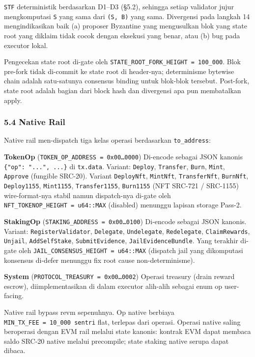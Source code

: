\documentclass[11pt,a4paper]{article}
\begin{document}
\texttt{STF} deterministik berdasarkan D1--D3 (§5.2), sehingga setiap validator jujur mengkomputasi \texttt{S\textquotesingle{}} yang sama dari \texttt{(S,\ B)} yang sama. Divergensi pada langkah 14 mengindikasikan baik (a) proposer Byzantine yang mengusulkan blok yang state root yang diklaim tidak cocok dengan eksekusi yang benar, atau (b) bug pada executor lokal.

Pengecekan state root di-gate oleh \texttt{STATE\_ROOT\_FORK\_HEIGHT\ =\ 100\_000}. Blok pre-fork tidak di-commit ke state root di header-nya; determinisme bytewise chain adalah satu-satunya consensus binding untuk blok-blok tersebut. Post-fork, state root adalah bagian dari block hash dan divergensi apa pun membatalkan apply.

\hypertarget{native-rail}{%
\subsubsection{5.4 Native Rail}\label{native-rail}}

Native rail men-dispatch tiga kelas operasi berdasarkan \texttt{to\_address}:

\textbf{TokenOp} (\texttt{TOKEN\_OP\_ADDRESS\ =\ 0x00…0000})
Di-encode sebagai JSON kanonis \texttt{\{"op":\ "...",\ ...\}} di \texttt{tx.data}. Variant: \texttt{Deploy}, \texttt{Transfer}, \texttt{Burn}, \texttt{Mint}, \texttt{Approve} (fungible SRC-20). Variant \texttt{DeployNft}, \texttt{MintNft}, \texttt{TransferNft}, \texttt{BurnNft}, \texttt{Deploy1155}, \texttt{Mint1155}, \texttt{Transfer1155}, \texttt{Burn1155} (NFT SRC-721 / SRC-1155) wire-format-nya stabil namun dispatch-nya di-gate oleh \texttt{NFT\_TOKENOP\_HEIGHT\ =\ u64::MAX} (disabled) menunggu lapisan storage Pass-2.

\textbf{StakingOp} (\texttt{STAKING\_ADDRESS\ =\ 0x00…0100})
Di-encode sebagai JSON kanonis. Variant: \texttt{RegisterValidator}, \texttt{Delegate}, \texttt{Undelegate}, \texttt{Redelegate}, \texttt{ClaimRewards}, \texttt{Unjail}, \texttt{AddSelfStake}, \texttt{SubmitEvidence}, \texttt{JailEvidenceBundle}. Yang terakhir di-gate oleh \texttt{JAIL\_CONSENSUS\_HEIGHT\ =\ u64::MAX} (dispatch jail yang dikomputasi konsensus di-defer menunggu fix root cause non-determinisme).

\textbf{System} (\texttt{PROTOCOL\_TREASURY\ =\ 0x00…0002})
Operasi treasury (drain reward escrow), diimplementasikan di dalam executor alih-alih sebagai enum op user-facing.

Native rail bypass revm sepenuhnya. Op native berbiaya \texttt{MIN\_TX\_FEE\ =\ 10\_000\ sentri} flat, terlepas dari operasi. Operasi native saling beroperasi dengan EVM rail melalui state kanonis: kontrak EVM dapat membaca saldo SRC-20 native melalui precompile; state staking native serupa dapat dibaca.
\end{document}
